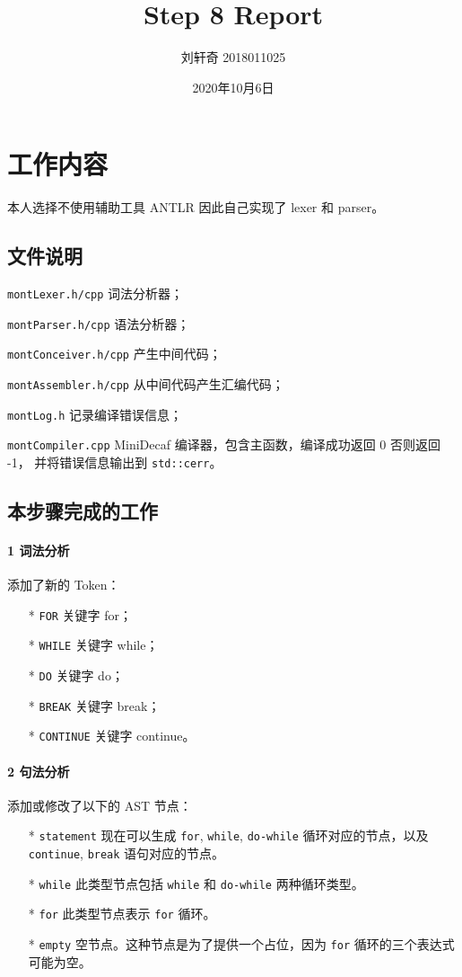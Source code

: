 \documentclass[UTF8]{ctexart}
\title{Step 8 Report}
\author{刘轩奇 2018011025}
\date{2020年10月6日}
\newcommand{\T}[1]{\texttt{{#1}}}
\begin{document}
    \maketitle
    \section{工作内容}
        本人选择不使用辅助工具 ANTLR 因此自己实现了 lexer 和 parser。
        \subsection{文件说明} 
            \T{montLexer.h/cpp} 词法分析器；

            \T{montParser.h/cpp} 语法分析器；

            \T{montConceiver.h/cpp} 产生中间代码；

            \T{montAssembler.h/cpp} 从中间代码产生汇编代码；
            
            \T{montLog.h} 记录编译错误信息；

            \T{montCompiler.cpp} MiniDecaf 编译器，包含主函数，编译成功返回 0 否则返回 -1，
            并将错误信息输出到 \T{std::cerr}。
        
        \subsection{本步骤完成的工作}

            \paragraph{1 词法分析} 添加了新的 Token：
            \begin{itemize}
                \item[*] \T{FOR} 关键字 for；
                \item[*] \T{WHILE} 关键字 while；
                \item[*] \T{DO} 关键字 do；
                \item[*] \T{BREAK} 关键字 break；
                \item[*] \T{CONTINUE} 关键字 continue。   
            \end{itemize}

            \paragraph{2 句法分析} 添加或修改了以下的 AST 节点：
            \begin{itemize}
                \item[*] \T{statement} 现在可以生成 \T{for}, \T{while}, \T{do-while} 循环对应的节点，以及 \T{continue}, \T{break} 语句对应的节点。
                \item[*] \T{while} 此类型节点包括 \T{while} 和 \T{do-while} 两种循环类型。
                \item[*] \T{for} 此类型节点表示 \T{for} 循环。
                \item[*] \T{empty} 空节点。这种节点是为了提供一个占位，因为 \T{for} 循环的三个表达式可能为空。 
            \end{itemize}
\end{document}
